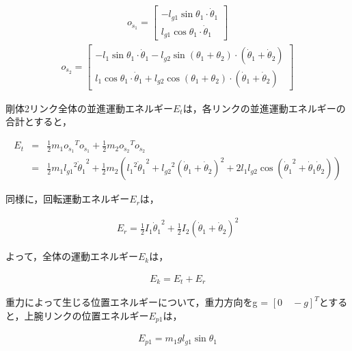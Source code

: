\begin{eqnarray}
  o_{\dot{s}_{1}} = 
              \begin{bmatrix}
              -l_{g1}\sin\theta_{1} \cdot \dot{\theta}_{1}\\
              l_{g1}\cos\theta_{1} \cdot \dot{\theta}_{1}
              \end{bmatrix}
\end{eqnarray}
\begin{eqnarray}
  o_{\dot{s}_{2}} = 
              \begin{bmatrix}
                -l_{1}\sin\theta_{1} \cdot \dot{\theta}_{1} - l_{g2}\sin(\theta_{1} + \theta_{2}) \cdot (\dot{\theta}_{1} + \dot{\theta}_{2})\\
                l_{1}\cos\theta_{1} \cdot \dot{\theta}_{1} + l_{g2}\cos(\theta_{1} + \theta_{2}) \cdot (\dot{\theta}_{1} + \dot{\theta}_{2})
              \end{bmatrix}
\end{eqnarray}

剛体2リンク全体の並進運動エネルギー$E_{t}$は，各リンクの並進運動エネルギーの合計とすると，

\begin{eqnarray}
  E_{t}
  &=&\frac{1}{2}m_{1}o_{\dot{s}_{1}}{}^T\!o_{\dot{s}_{1}} + \frac{1}{2}m_{2}o_{\dot{s}_{2}}{}^T\!o_{\dot{s}_{2}} \nonumber \\
  &=&\frac{1}{2}m_{1}{l_{g1}}^2{\dot{\theta}_{1}}^2 + \frac{1}{2}m_{2}({{l_{1}}^2}{\dot{\theta}_{1}}^2 + {l_{g2}}^2(\dot{\theta}_{1} + \dot{\theta}_{2})^2 + 2{l_{1}}{l_{g2}}\cos({\dot{\theta}_{1}}^2 + \dot{\theta}_{1}\dot{\theta}_{2}))
\end{eqnarray}

同様に，回転運動エネルギー$E_{r}$は，

\begin{eqnarray}
  E_{r}
  =\frac{1}{2}I_{1}{\dot{\theta}_{1}}^2 + \frac{1}{2}I_{2}(\dot{\theta}_{1} + \dot{\theta}_{2})^2
\end{eqnarray}

よって，全体の運動エネルギー$E_{k}$は，

\begin{eqnarray}
  E_{k}
  =E_{t} + E_{r}
\end{eqnarray}

重力によって生じる位置エネルギーについて，重力方向をg = ${[0 \quad -g]}^T$とすると，上腕リンクの位置エネルギー$E_{p1}$は，

\begin{eqnarray}
  E_{p1}
  =m_{1}gl_{g1}\sin\theta_{1}
\end{eqnarray}

